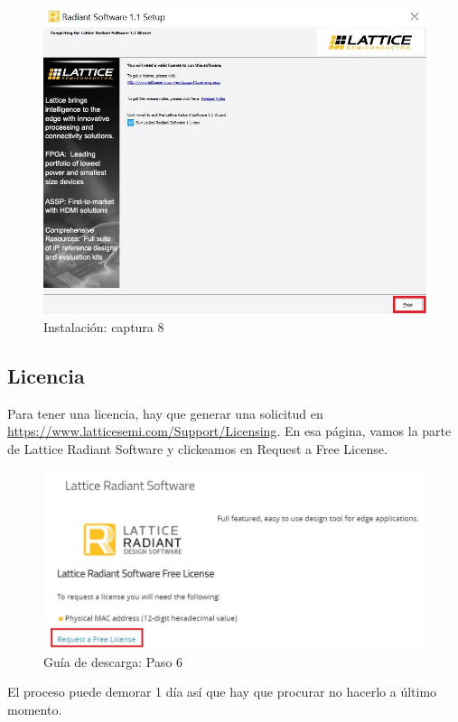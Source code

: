 \documentclass{article}
\begin{document}
\begin{figure}[H]
\centering
\includegraphics[width=0.8\linewidth]{Imagenes/inst8.JPG}
\caption{Instalación: captura 8 }
\label{fig:install}
\end{figure}



\subsection{Licencia}
Para tener una licencia, hay que generar una solicitud en
\href{https://www.latticesemi.com/Support/Licensing}{https://www.latticesemi.com/Support/Licensing}.
En esa página, vamos la parte de Lattice Radiant Software y clickeamos en Request a Free License.

\begin{figure}[H]
\centering
\includegraphics[width=1\linewidth]{Imagenes/6.JPG}
\caption{Guía de descarga: Paso 6}
\label{fig:step6}
\end{figure}

El proceso puede demorar 1 día así que hay que procurar no hacerlo a último momento.
\end{document}
